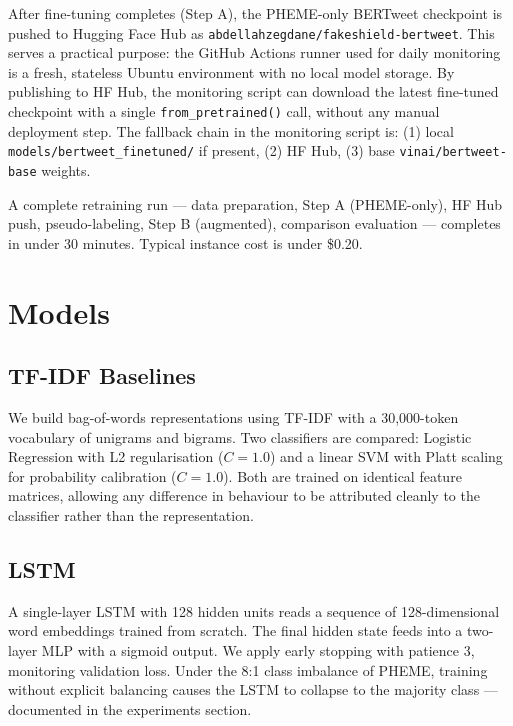 \documentclass[sigconf]{acmart}
\begin{document}
After fine-tuning completes (Step A), the PHEME-only BERTweet checkpoint is pushed to
Hugging Face Hub as \texttt{abdellahzegdane/fakeshield-bertweet}. This serves a practical
purpose: the GitHub Actions runner used for daily monitoring is a fresh, stateless Ubuntu
environment with no local model storage. By publishing to HF Hub, the monitoring script can
download the latest fine-tuned checkpoint with a single \texttt{from\_pretrained()} call,
without any manual deployment step. The fallback chain in the monitoring script is:
(1) local \texttt{models/bertweet\_finetuned/} if present, (2) HF Hub, (3) base
\texttt{vinai/bertweet-base} weights.

A complete retraining run — data preparation, Step A (PHEME-only), HF Hub push, pseudo-labeling,
Step B (augmented), comparison evaluation — completes in under 30 minutes. Typical
instance cost is under \$0.20.


\section{Models}

\subsection{TF-IDF Baselines}

We build bag-of-words representations using TF-IDF with a 30,000-token vocabulary of
unigrams and bigrams. Two classifiers are compared: Logistic Regression with L2
regularisation ($C=1.0$) and a linear SVM with Platt scaling for probability calibration
($C=1.0$). Both are trained on identical feature matrices, allowing any difference in
behaviour to be attributed cleanly to the classifier rather than the representation.

\subsection{LSTM}

A single-layer LSTM with 128 hidden units reads a sequence of 128-dimensional word
embeddings trained from scratch. The final hidden state feeds into a two-layer MLP
with a sigmoid output. We apply early stopping with patience 3, monitoring validation
loss. Under the 8:1 class imbalance of PHEME, training without explicit balancing causes
the LSTM to collapse to the majority class — documented in the experiments section.
\end{document}
